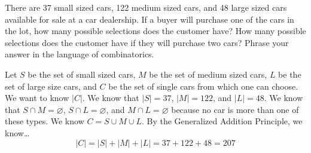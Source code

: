 \documentclass[11pt,letterpaper]{article}
\begin{document}

 There are 37 small sized cars, 122 medium sized cars, and 48 large sized cars available for sale at a car dealership. If a buyer will purchase one of the cars in the lot, how many possible selections does the customer have? How many possible selections does the customer have if they will purchase two cars? Phrase your answer in the language of combinatorics. \pspace

\sol Let $S$ be the set of small sized cars, $M$ be the set of medium sized cars, $L$ be the set of large size cars, and $C$ be the set of single cars from which one can choose. We want to know $|C|$. We know that $|S|= 37$, $|M|= 122$, and $|L|= 48$. We know that $S \cap M= \varnothing$, $S \cap L= \varnothing$, and $M \cap L= \varnothing$ because no car is more than one of these types.  We know $C= S \cup M \cup L$. By the Generalized Addition Principle, we know\dots
	\[
	|C|= |S| + |M| + |L|= 37 + 122 + 48= 207
	\] \pspace
\end{document}
